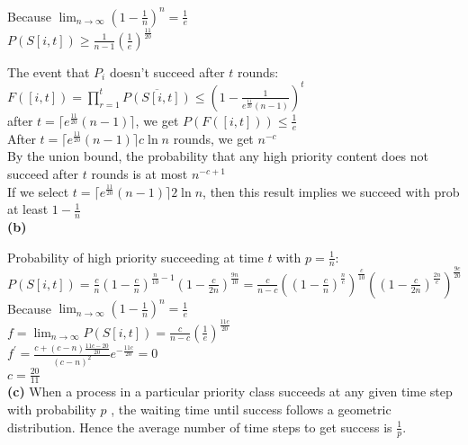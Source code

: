 \documentclass[11pt]{exam}
\begin{document}
Because $\lim_{n \to \infty} \left(1 - \frac{1}{n}\right)^n = \frac{1}{e}$\\

$P(S[i,t])\geq\frac{1}{n-1}(\frac{1}{e})^{\frac{11}{20}}$

The event that $P_i$ doesn’t succeed after $t$ rounds:$F([i, t]) = \prod_{r=1}^{t} \overline{P(S[i, t])} \leq (1-\frac{1}{e^{\frac{11}{20}}(n-1)})^t$\\

after $t=\lceil e^{\frac{11}{20}}(n-1) \rceil$, we get $P(F([i, t])) \leq \frac{1}{e}$\\

After $t=\lceil e^{\frac{11}{20}}(n-1) \rceil c\ln n$ rounds, we get $n^{-c}$\\

By the union bound, the probability that any high priority content does not succeed after $t$ rounds is at most $n^{-c+1}$\\

If we select $t=\lceil e^{\frac{11}{20}}(n-1) \rceil 2\ln n$, then this result implies we succeed with prob at least $1-\frac{1}{n}$\\
\noindent\textbf{(b)}

Probability of high priority succeeding at time $t$ with $p=\frac{1}{n}$: \\

$P(S[i,t])=\frac{c}{n}(1-\frac{c}{n})^{\frac{n}{10}-1}(1-\frac{c}{2n})^{\frac{9n}{10}}=\frac{c}{n-c}((1-\frac{c}{n})^{\frac{n}{c}})^{\frac{c}{10}}((1-\frac{c}{2n})^{\frac{2n}{c}})^{\frac{9c}{20}}$\\

Because $\lim_{n \to \infty} \left(1 - \frac{1}{n}\right)^n = \frac{1}{e}$\\

$f=\lim_{n \to \infty} P(S[i,t])=\frac{c}{n-c}(\frac{1}{e})^{\frac{11c}{20}}$\\

$f^{'}=\frac{c + (c - n) \frac{11c - 20}{20}}{(c - n)^2} e^{-\frac{11c}{20}}=0$\\

$c = \frac{20}{11}$\\
\noindent\textbf{(c)}
When a process in a particular priority class succeeds at any given time step with probability $p$ , the waiting time until success follows a geometric distribution. Hence the average number of time steps to get success is $\frac{1}{p}$.\\ 
\end{document}
